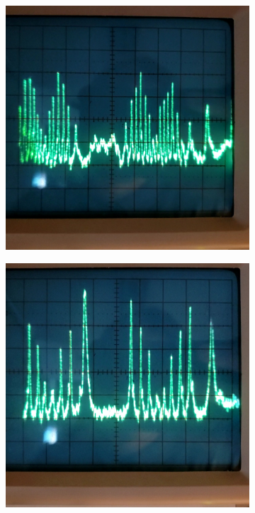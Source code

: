 \begin{figure}[h]
     \centering
     \begin{subfigure}[b]{0.3\textwidth}
         \centering
         \includegraphics[width=\textwidth]{oscHigh.jpg}
         \caption{}
         \label{fig:high}
     \end{subfigure}
     \hfill
     \begin{subfigure}[b]{0.3\textwidth}
         \centering
         \includegraphics[width=\textwidth]{oscMed.jpg}

\end{subfigure}
\end{figure}
